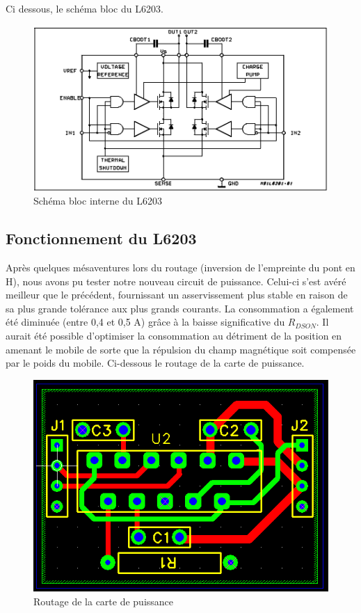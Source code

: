 \documentclass[11pt, french]{article} %
\begin{document}
Ci dessous, le schéma bloc du L6203. 

\begin{figure}[h!]
	\centering
	\includegraphics[width = 12cm]{SolutionNumerique/fonc_sch.png} 
	\caption{Schéma bloc interne du L6203}
\end{figure}

\subsection{Fonctionnement du L6203}

Après quelques mésaventures lors du routage (inversion de l'empreinte du pont en H), nous avons pu tester notre nouveau circuit de puissance. Celui-ci s'est avéré meilleur que le précédent, fournissant un asservissement plus stable en raison de sa plus grande tolérance aux plus grands courants. La consommation a également été diminuée (entre 0,4 et 0,5 A) grâce à la baisse significative du $R_{DSON}$. Il aurait été possible d'optimiser la consommation au détriment de la position en amenant le mobile de sorte que la répulsion du champ magnétique soit compensée par le poids du mobile. Ci-dessous le routage de la carte de puissance. 

\begin{figure}[h!]
	\centering
	\includegraphics[width = 12cm]{SolutionNumerique/routage.png} 
	\caption{Routage de la carte de puissance}
\end{figure}
\end{document}
